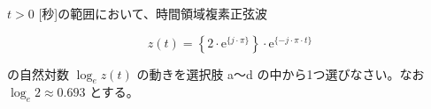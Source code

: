$t > 0$ [秒]の範囲において、時間領域複素正弦波 

\[
z(t) =  \left \{ 2 \cdot \textrm{e}^{\{ j \cdot \pi \}} \right \} \cdot \textrm{e}^{\{ -j \cdot \pi \cdot t \}}
\]

\bigskip
\noindent の自然対数 $\log_e z(t)$ の動きを選択肢 a〜d の中から1つ選びなさい。なお $\log_e 2 \approx 0.693$ とする。
